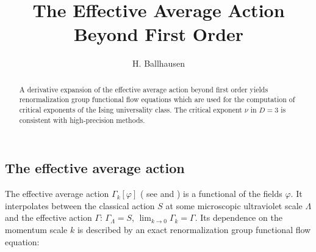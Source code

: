 \documentclass[a4paper,aps,prl,twocolumn,groupedaddress]{revtex4}
\begin{document}
\newcommand{\Ui}{U^\prime}
\newcommand{\Uii}{U^{\prime\prime}}
\newcommand{\Uiii}{U^{\prime\prime\prime}}
\newcommand{\Uiiii}{U^{\prime\prime\prime\prime}}

\newcommand{\Z}{Z_0}
\newcommand{\Zi}{{Z_0^\prime}}
\newcommand{\Zii}{Z_0^{\prime\prime}}

\newcommand{\ZZ}{Z_1}
\newcommand{\ZZi}{{Z_1^\prime}}
\newcommand{\ZZii}{Z_1^{\prime\prime}}

\newcommand{\ui}{u^\prime}
\newcommand{\uii}{u^{\prime\prime}}
\newcommand{\uiii}{u^{\prime\prime\prime}}
\newcommand{\uiiii}{u^{\prime\prime\prime\prime}}

\newcommand{\z}{z_0}
\newcommand{\zi}{{z_0^\prime}}
\newcommand{\zii}{z_0^{\prime\prime}}

\newcommand{\zz}{z_1}
\newcommand{\zzi}{{z_1^\prime}}
\newcommand{\zzii}{z_1^{\prime\prime}}





\title{The Effective Average Action Beyond First Order}
\author{H. Ballhausen}

\begin{abstract}
\noindent
A derivative expansion of the effective average action beyond first order yields renormalization
group functional flow equations which are used for the computation of critical exponents of the
Ising universality class. The critical exponent $\nu$ in $D=3$ is consistent with high-precision methods.
\end{abstract}

\maketitle





\subsection*{The effective average action}

\noindent
The effective average action $\Gamma_k[\varphi]$ ( see \cite{Lit1} and \cite{Lit2,Lit3,Lit4,Lit5} ) is a functional of the fields
$\varphi$. It interpolates between the classical action $S$ at some microscopic ultraviolet scale
$\Lambda$ and the effective action $\Gamma$: $\Gamma_\Lambda=S$, $\lim_{k\to 0} \Gamma_k = \Gamma$.
Its dependence on the momentum scale $k$ is described by an exact renormalization group
functional flow equation:
\end{document}
